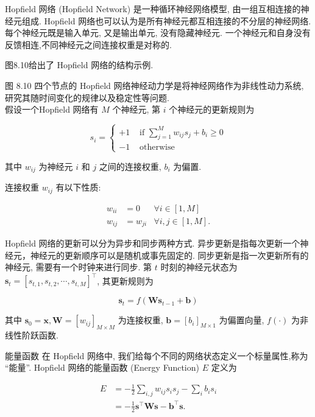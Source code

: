 \documentclass[10pt]{article}
\begin{document}
Hopfield 网络 (Hopfield Network) 是一种循环神经网络模型, 由一组互相连接的神经元组成. Hopfield 网络也可以认为是所有神经元都互相连接的不分层的神经网络. 每个神经元既是输入单元, 又是输出单元, 没有隐藏神经元. 一个神经元和自身没有反馈相连,不同神经元之间连接权重是对称的.

图8.10给出了 Hopfield 网络的结构示例.



图 8.10 四个节点的 Hopfield 网络神经动力学是将神经网络作为非线性动力系统, 研究其随时间变化的规律以及稳定性等问题.\\
假设一个Hopfield 网络有 $M$ 个神经元, 第 $i$ 个神经元的更新规则为

\[
s_{i}= \begin{cases}+1 & \text { if } \sum_{j=1}^{M} w_{i j} s_{j}+b_{i} \geq 0  \tag{8.32}\\ -1 & \text { otherwise }\end{cases}
\]

其中 $w_{i j}$ 为神经元 $i$ 和 $j$ 之间的连接权重, $b_{i}$ 为偏置.

连接权重 $w_{i j}$ 有以下性质:

\[
\begin{array}{lll}
w_{i i} & =0 & \forall i \in[1, M]  \tag{8.33}\\
w_{i j} & =w_{j i} & \forall i, j \in[1, M] .
\end{array}
\]

Hopfield 网络的更新可以分为异步和同步两种方式. 异步更新是指每次更新一个神经元，神经元的更新顺序可以是随机或事先固定的. 同步更新是指一次更新所有的神经元, 需要有一个时钟来进行同步. 第 $t$ 时刻的神经元状态为 $\boldsymbol{s}_{t}=\left[s_{t, 1}, s_{t, 2}, \cdots, s_{t, M}\right]^{\top}$, 其更新规则为


\begin{equation*}
\boldsymbol{s}_{t}=f\left(\boldsymbol{W} \boldsymbol{s}_{t-1}+\boldsymbol{b}\right) \tag{8.34}
\end{equation*}


其中 $\boldsymbol{s}_{0}=\boldsymbol{x}, \boldsymbol{W}=\left[w_{i j}\right]_{M \times M}$ 为连接权重, $\boldsymbol{b}=\left[b_{i}\right]_{M \times 1}$ 为偏置向量, $f(\cdot)$ 为非线性阶跃函数.

能量函数 在 Hopfield 网络中, 我们给每个不同的网络状态定义一个标量属性,称为 “能量”. Hopfield 网络的能量函数 (Energy Function) $E$ 定义为


\begin{align*}
E & =-\frac{1}{2} \sum_{i, j} w_{i j} s_{i} s_{j}-\sum_{i} b_{i} s_{i}  \tag{8.35}\\
& =-\frac{1}{2} \boldsymbol{s}^{\top} \boldsymbol{W} \boldsymbol{s}-\boldsymbol{b}^{\top} \boldsymbol{s} . \tag{8.36}
\end{align*}
\end{document}
